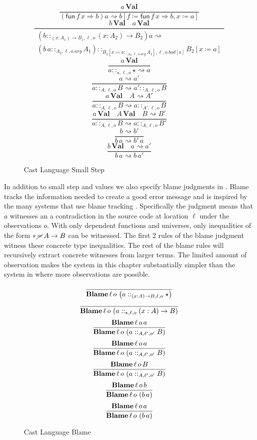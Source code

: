 \begin{figure}
\[
\frac{a\,\textbf{Val}}{\left(\mathsf{fun}\,f\,x\Rightarrow b\right)a\rightsquigarrow b\left[f\coloneqq\mathsf{fun}\,f\,x\Rightarrow b,x\coloneqq a\right]}
\]
\[
\frac{b\,\textbf{Val}\quad a\,\textbf{Val}}{\begin{array}{c}
\left(b::_{\left(x:A_{1}\right)\rightarrow B_{1},\ell ,o}\left(x:A_{2}\right)\rightarrow B_{2}\right)a\rightsquigarrow\\
\left(b\,a::_{A_{2},\ell,o.arg}A_{1}\right)::_{B_{1}\left[x\coloneqq a::_{A_{2},\ell,o.arg}A_{1}\right],\ell ,o.bod[a]}B_{2}\left[x\coloneqq a\right]
\end{array}}
\]
\[
\frac{a\,\textbf{Val}}{a::_{\star,\ell ,o}\star\rightsquigarrow a}
\]
\[
\frac{a\rightsquigarrow a'}{a::_{A,\ell ,o}B\rightsquigarrow a'::_{A,\ell ,o}B}
\]
\[
\frac{a\,\textbf{Val}\quad A\rightsquigarrow A'}{a::_{A,\ell ,o}B\rightsquigarrow a::_{A',\ell ,o}B}
\]
\[
\frac{a\,\textbf{Val}\quad A\,\textbf{Val}\quad B\rightsquigarrow B'}{a::_{A,\ell ,o}B\rightsquigarrow a::_{A,\ell ,o}B'}
\]
\[
\frac{b\rightsquigarrow b'}{b\,a\rightsquigarrow b'\,a}
\]
\[
\frac{b\,\textbf{Val}\quad a\rightsquigarrow a'}{b\,a\rightsquigarrow b\,a'}
\]
 
\caption{Cast Language Small Step}
\label{fig:cast-step}
\end{figure}
 
In addition to small step and values we also specify blame judgments in .
Blame tracks the information needed to create a good error message and is inspired by the many systems that use blame tracking \cite{10.1145/581478.581484,10.1007/978-3-642-00590-9_1,wadler:LIPIcs:2015:5033}.
Specifically the judgment  means that $a$ witnesses an a contradiction in the source code at location $\ell$ under the observations $o$.
With only dependent functions and universes, only inequalities of the form $*\,\cancel{=}\,A\rightarrow B$ can be witnessed.
The first 2 rules of the blame judgment witness these concrete type inequalities.
The rest of the blame rules will recursively extract concrete witnesses from larger terms.
The limited amount of observation makes the system in this chapter substantially simpler than the system in  where more observations are possible.
 
\begin{figure}
\[
\frac{\,}{\blame{\left(a::_{\left(x:A\right)\rightarrow B,\ell ,o}\star\right)}{\ell}{o}}
\]
\[
\frac{\,}{\blame{\left(a::_{\star,\ell ,o}\left(x:A\right)\rightarrow B\right)}{\ell}{o}}
\]
\[
\frac{
 \blame{a}{\ell}{o}
}{
 \blame{\left(a::_{A,\ell',o'}B\right)}{\ell}{o}
}
\]
\[
\frac{
 \blame{a}{\ell}{o}
}{
 \blame{\left(a::_{A,\ell',o'}B\right)}{\ell}{o}
}
\]
\[
\frac{
 \blame{B}{\ell}{o}
}{
 \blame{\left(a::_{A,\ell',o'}B\right)}{\ell}{o}
}
\]
\[
\frac{
 \blame{b}{\ell}{o}
}{
 \blame{\left(b\,a\right)}{\ell}{o}
}
\]
\[
\frac{
 \blame{a}{\ell}{o}
}{
 \blame{\left(b\,a\right)}{\ell}{o}
}
\]
\caption{Cast Language Blame}
\label{fig:cast-blame}
\end{figure}
 
